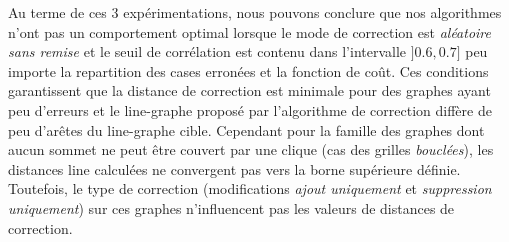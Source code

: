 %

Au terme de ces $3$ exp\'erimentations, nous pouvons conclure que nos algorithmes n'ont pas un comportement optimal lorsque le mode de correction est {\em al\'eatoire sans remise}  et le seuil de corr\'elation est contenu dans l'intervalle $]0.6,0.7]$ peu importe la repartition des cases erron\'ees et la fonction de co\^ut. 
Ces conditions garantissent que la distance de correction est minimale pour des graphes ayant peu d'erreurs et le line-graphe propos\'e par l'algorithme de correction diff\`ere de peu d'ar\^etes du line-graphe cible. 
 Cependant pour la famille des graphes dont aucun sommet ne peut \^etre couvert par une clique (cas des grilles {\em boucl\'ees}),  les distances line calcul\'ees ne convergent pas vers la borne sup\'erieure d\'efinie. Toutefois, le type de correction (modifications {\em ajout uniquement} et {\em suppression uniquement}) sur ces graphes n'influencent pas les valeurs de distances de correction. 


